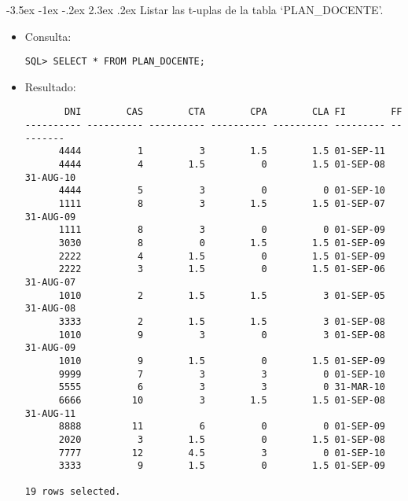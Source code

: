 \documentclass[11pt]{report}
\makeatletter
\renewcommand\chapter{\@startsection{chapter}{0}{\z@}%
    {-3.5ex \@plus -1ex \@minus -.2ex}%
    {2.3ex \@plus.2ex}%
    {\normalfont\Large\bfseries}}
\makeatother
\begin{document}
\chapter{Listar las t-uplas de la tabla ‘PLAN\_DOCENTE’.}
\begin{itemize}
  \item Consulta:
  \begin{verbatim}
SQL> SELECT * FROM PLAN_DOCENTE;
  \end{verbatim}

  \newpage

  \item{Resultado:}
  \begin{verbatim}
       DNI        CAS        CTA        CPA        CLA FI        FF                                 
---------- ---------- ---------- ---------- ---------- --------- ---------                          
      4444          1          3        1.5        1.5 01-SEP-11                                    
      4444          4        1.5          0        1.5 01-SEP-08 31-AUG-10                          
      4444          5          3          0          0 01-SEP-10                                    
      1111          8          3        1.5        1.5 01-SEP-07 31-AUG-09                          
      1111          8          3          0          0 01-SEP-09                                    
      3030          8          0        1.5        1.5 01-SEP-09                                    
      2222          4        1.5          0        1.5 01-SEP-09                                    
      2222          3        1.5          0        1.5 01-SEP-06 31-AUG-07                          
      1010          2        1.5        1.5          3 01-SEP-05 31-AUG-08                          
      3333          2        1.5        1.5          3 01-SEP-08                                    
      1010          9          3          0          3 01-SEP-08 31-AUG-09                          
      1010          9        1.5          0        1.5 01-SEP-09                                    
      9999          7          3          3          0 01-SEP-10                                    
      5555          6          3          3          0 31-MAR-10                                    
      6666         10          3        1.5        1.5 01-SEP-08 31-AUG-11                          
      8888         11          6          0          0 01-SEP-09                                    
      2020          3        1.5          0        1.5 01-SEP-08                                    
      7777         12        4.5          3          0 01-SEP-10                                    
      3333          9        1.5          0        1.5 01-SEP-09                                    

19 rows selected.
  \end{verbatim}
\end{itemize}
\end{document}
